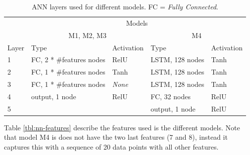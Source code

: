 \begin{table}[h]
	\centering
	\caption{ANN layers used for different models. FC = \textit{Fully Connected}.}
	\label{tbl:nn-layers}
	\begin{tabular}{l|l|l|l|l}
		& \multicolumn{4}{c}{Models}                                                                                           \\ \cline{2-5} 
		& \multicolumn{2}{c|}{M1, M2, M3}                           & \multicolumn{2}{c}{M4}                                   \\ \hline
		Layer & Type                     & Activation                     & Type                     & Activation                     \\ \hline
		1     & FC, 2 * \#features nodes & RelU                           & LSTM, 128 nodes          & Tanh                        \\
		2     & FC, 1 * \#features nodes & Tanh                           & LSTM, 128 nodes          & Tanh                        \\
		3     & FC, 1 * \#features nodes & \textit{None} & LSTM, 128 nodes          & Tanh                        \\
		4     & output, 1 node           & RelU                           & FC, 32 nodes & RelU                           \\
		5     &                          &                                & output, 1 node           & RelU
	\end{tabular}
\end{table}

Table \ref{tbl:nn-features} describe the features used is the different models. Note that model M4 is does not have the two last features (7 and 8), instead it captures this with a sequence of 20 data points with all other features.

